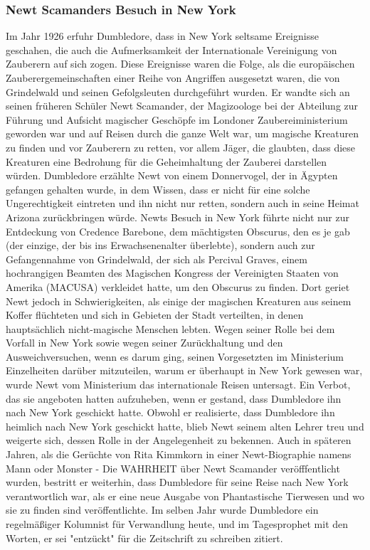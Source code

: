 \documentclass[a4paper, 10pt]{article}
\begin{document}
\subsubsection*{Newt Scamanders Besuch in New York}
Im Jahr 1926 erfuhr Dumbledore, dass in New York seltsame Ereignisse geschahen, die auch die Aufmerksamkeit der Internationale Vereinigung von Zauberern auf sich zogen. Diese Ereignisse waren die Folge, als die europäischen Zauberergemeinschaften einer Reihe von Angriffen ausgesetzt waren, die von Grindelwald und seinen Gefolgsleuten durchgeführt wurden.
\vspace{10pt}
\newline
Er wandte sich an seinen früheren Schüler Newt Scamander, der Magizoologe bei der Abteilung zur Führung und Aufsicht magischer Geschöpfe im Londoner Zaubereiministerium geworden war und auf Reisen durch die ganze Welt war, um magische Kreaturen zu finden und vor Zauberern zu retten, vor allem Jäger, die glaubten, dass diese Kreaturen eine Bedrohung für die Geheimhaltung der Zauberei darstellen würden. Dumbledore erzählte Newt von einem Donnervogel, der in Ägypten gefangen gehalten wurde, in dem Wissen, dass er nicht für eine solche Ungerechtigkeit eintreten und ihn nicht nur retten, sondern auch in seine Heimat Arizona zurückbringen würde. Newts Besuch in New York führte nicht nur zur Entdeckung von Credence Barebone, dem mächtigsten Obscurus, den es je gab (der einzige, der bis ins Erwachsenenalter überlebte), sondern auch zur Gefangennahme von Grindelwald, der sich als Percival Graves, einem hochrangigen Beamten des Magischen Kongress der Vereinigten Staaten von Amerika (MACUSA) verkleidet hatte, um den Obscurus zu finden. Dort geriet Newt jedoch in Schwierigkeiten, als einige der magischen Kreaturen aus seinem Koffer flüchteten und sich in Gebieten der Stadt verteilten, in denen hauptsächlich nicht-magische Menschen lebten.
\vspace{10pt}
\newline
Wegen seiner Rolle bei dem Vorfall in New York sowie wegen seiner Zurückhaltung und den Ausweichversuchen, wenn es darum ging, seinen Vorgesetzten im Ministerium Einzelheiten darüber mitzuteilen, warum er überhaupt in New York gewesen war, wurde Newt vom Ministerium das internationale Reisen untersagt. Ein Verbot, das sie angeboten hatten aufzuheben, wenn er gestand, dass Dumbledore ihn nach New York geschickt hatte. Obwohl er realisierte, dass Dumbledore ihn heimlich nach
New York geschickt hatte, blieb Newt seinem alten Lehrer treu und weigerte sich, dessen Rolle in der Angelegenheit zu bekennen. Auch in späteren Jahren, als die Gerüchte von Rita Kimmkorn in einer Newt-Biographie namens Mann oder Monster - Die WAHRHEIT über Newt Scamander veröfffentlicht wurden, bestritt er weiterhin, dass Dumbledore für seine Reise nach New York verantwortlich war, als er eine neue Ausgabe von Phantastische Tierwesen und wo sie zu finden sind veröffentlichte.
\vspace{10pt}
\newline
Im selben Jahr wurde Dumbledore ein regelmäßiger Kolumnist für Verwandlung heute, und im Tagesprophet mit den Worten, er sei "entzückt" für die Zeitschrift zu schreiben zitiert.
\end{document}
